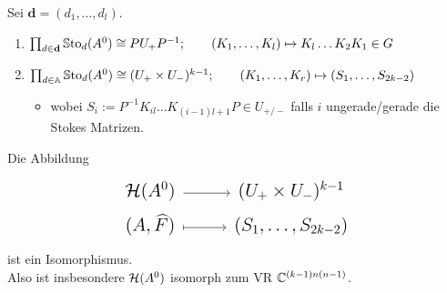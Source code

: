\begin{lem}
  Sei $\textbf{d}=(d_1,\dots,d_l)$.
  \begin{enumerate}
    \item $\prod_{d\in\textbf{d}}\operatorname{\mathbb{S}to}_d(A^0)\cong PU_+P^{-1};
      \qquad
      (K_1,\dots,K_l)\mapsto K_l\dots K_2K_1\in G$
    \item $\prod_{d\in\mathbb{A}}\operatorname{\mathbb{S}to}_d(A^0)\cong (U_+\times U_-)^{k-1};
      \qquad
      (K_1,\dots,K_r)\mapsto (S_1,\dots,S_{2k-2})$
      \begin{itemize}
        \item wobei $S_i:=P^{-1}K_{il}\dots K_{(i-1)l+1}P\in U_{+/-}$ falls $i$
          ungerade/gerade die Stokes Matrizen.
      \end{itemize}
  \end{enumerate}
\end{lem}

\begin{thm}
  Die Abbildung
  \[ \Large\begin{tikzcd}[row sep=0em]
      \cH(A^0) \rar & (U_+\times U_-)^{k-1}
    \\(A,\hat F) \rar[mapsto] & (S_1,\dots,S_{2k-2})
  \end{tikzcd} \]
  ist ein Isomorphismus.
  \\Also ist insbesondere $\mathcal{H}(A^0)$ isomorph zum VR $\mathbb{C}^{(k-1)n(n-1)}$.
\end{thm}
